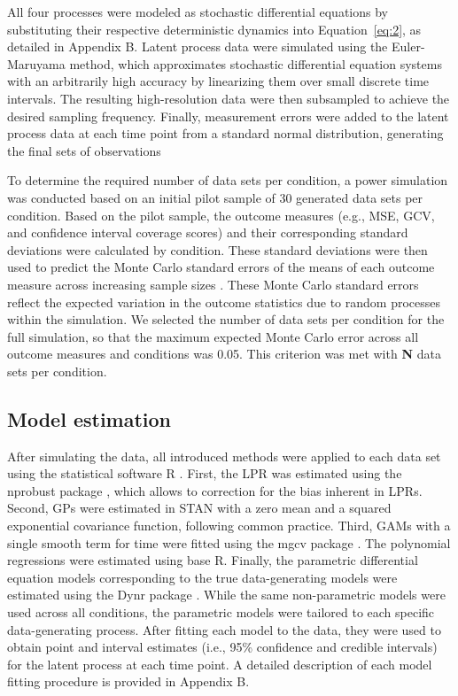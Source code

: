 \documentclass[man, floatsintext]{apa7}
\begin{document}
All four processes were modeled as stochastic differential equations by
substituting their respective deterministic dynamics into Equation~\ref{eq:2},
as detailed in Appendix B. Latent process data were simulated using the
Euler-Maruyama method, which approximates stochastic differential equation
systems with an arbitrarily high accuracy by linearizing them over small
discrete time intervals. The resulting high-resolution data were then
subsampled to achieve the desired sampling frequency. Finally, measurement
errors were added to the latent process data at each time point from a standard
normal distribution, generating the final sets of observations

To determine the required number of data sets per condition, a power simulation
was conducted based on an initial pilot sample of 30 generated data sets per
condition. Based on the pilot sample, the outcome measures (e.g., MSE, GCV, and
confidence interval coverage scores) and their corresponding standard
deviations were calculated by condition. These standard deviations were then
used to predict the Monte Carlo standard errors of the means of each outcome
measure across increasing sample sizes \parencite{siepe_simulation_2023}. These
Monte Carlo standard errors reflect the expected variation in the outcome
statistics due to random processes within the simulation. We selected the
number of data sets per condition for the full simulation, so that the maximum
expected Monte Carlo error across all outcome measures and conditions was 0.05.
This criterion was met with \textbf{N} data sets per condition.

\subsection{Model estimation}

After simulating the data, all introduced methods were applied to each data set
using the statistical software R \parencite{R-base}. First, the LPR was
estimated using the nprobust package \parencite{R-nprobust}, which allows to
correction for the bias inherent in LPRs. Second, GPs were estimated in STAN
\parencite{R-cmdstanr} with a zero mean and a squared exponential covariance
function, following common practice. Third, GAMs with a single smooth term for
time were fitted using the mgcv package \parencite{R-mgcv_a}. The polynomial
regressions were estimated using base R. Finally, the
parametric differential equation models corresponding to the true
data-generating models were estimated using the Dynr package
\parencite{R-dynr}. While the same non-parametric models were used across all
conditions, the parametric models were tailored to each specific
data-generating process. After fitting each model to the data, they were used
to obtain point and interval estimates (i.e., 95\% confidence and credible
intervals) for the latent process at each time point. A detailed description of
each model fitting procedure is provided in Appendix B.
\end{document}

